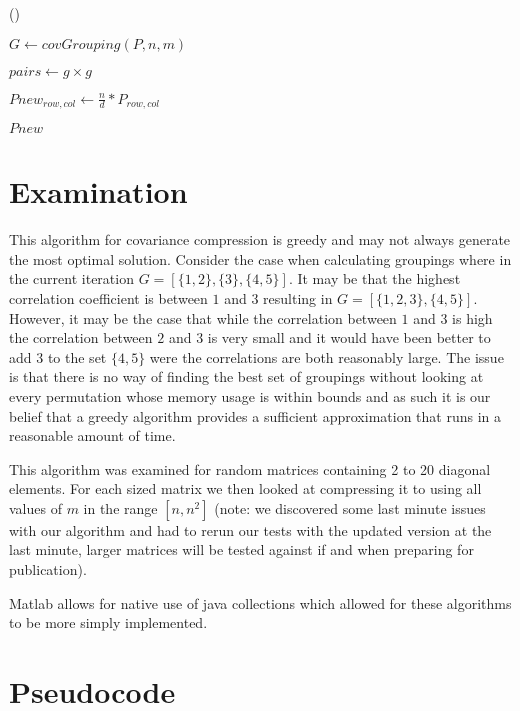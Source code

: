 \documentclass[11pt]{article}
\begin{document}
\begin{algorithm}

 \Begin() {
	$G\leftarrow covGrouping(P,n,m)$
	
	 {
		$pairs\leftarrow g \times g$
		
		 {
			$Pnew_{row,col}\leftarrow \frac{n}{d} * P_{row,col}$
		}
	}
	\Return $Pnew$
}	
\end{algorithm}

\section{Examination}
This algorithm for covariance compression is greedy and may not always generate the most optimal solution. 
Consider the case when calculating groupings where in the current iteration $G = \left[\{1,2\},\{3\},\{4,5\}\right]$. 
It may be that the highest correlation coefficient is between $1$ and $3$ resulting in $G = \left[\{1,2,3\},\{4,5\}\right]$.
However, it may be the case that while the correlation between $1$ and $3$ is high the correlation between $2$ and $3$ is very small and it would have been better to add $3$ to the set $\{4,5\}$ were the correlations are both reasonably large. 
The issue is that there is no way of finding the best set of groupings without looking at every permutation whose memory usage is within bounds and as such it is our belief that a greedy algorithm provides a sufficient approximation that runs in a reasonable amount of time. 
 
This algorithm was examined for random matrices containing 2 to 20 diagonal elements. 
For each sized matrix we then looked at compressing it to using all values of $m$ in the range $\left[n, n^2\right]$
(note: we discovered some last minute issues with our algorithm and had to rerun our tests with the updated version at the last minute, larger matrices will be tested against if and when preparing for publication).

\clearpage
\appendix
Matlab allows for native use of java collections which allowed for these algorithms to be more simply implemented. 
\section{Pseudocode}


\end{document}
